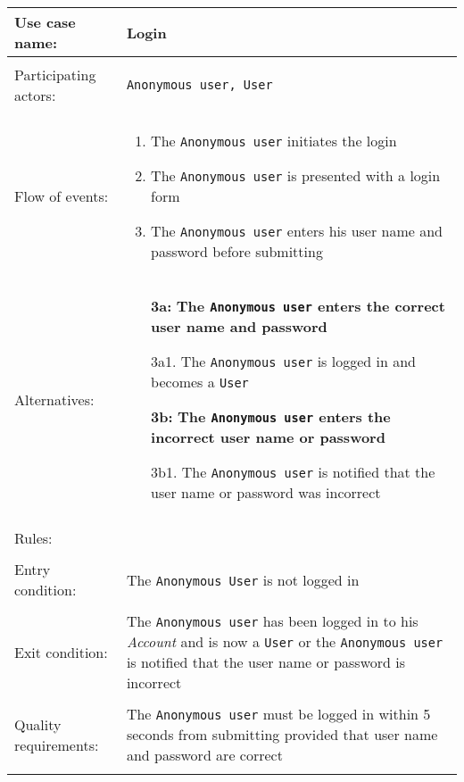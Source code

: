 \documentclass[../report.tex]{subfiles}
\begin{document}
\noindent
\begin{tabular}{ l p{8cm} }                 
 Use case name:  & Login   \\   \hline \\            
 Participating actors:  & \texttt{Anonymous user, User} \\   \hline \\   
 Flow of events: & \begin{enumerate}
\item{The \texttt{Anonymous user} initiates the login}
\item{The \texttt{Anonymous user} is presented with a login form}
\item{The \texttt{Anonymous user} enters his user name and password before submitting}
\end{enumerate} \\
Alternatives: & \begin{itemize}
\item[\textbf{3a:}] \textbf{The \texttt{Anonymous user} enters the correct user name and password}
\item[]  3a1. The \texttt{Anonymous user} is logged in and becomes a \texttt{User}
\item[\textbf{3b:}] \textbf{The \texttt{Anonymous user} enters the incorrect user name or password}
\item[]  3b1. The \texttt{Anonymous user} is notified that the user name or password was incorrect
\end{itemize} \\ 
\hline \\
Rules: & \\ \hline \\
Entry condition: & The \texttt{Anonymous User} is not logged in \\ \hline \\
Exit condition: & The \texttt{Anonymous user} has been logged in to his \textit{Account} and is now a \texttt{User} or the \texttt{Anonymous user} is notified that the user name or password is incorrect \\ \hline \\
Quality requirements: & The \texttt{Anonymous user} must be logged in within 5 seconds from submitting provided that user name and password are correct \\ \hline \\            
\end{tabular} \\
\end{document}
